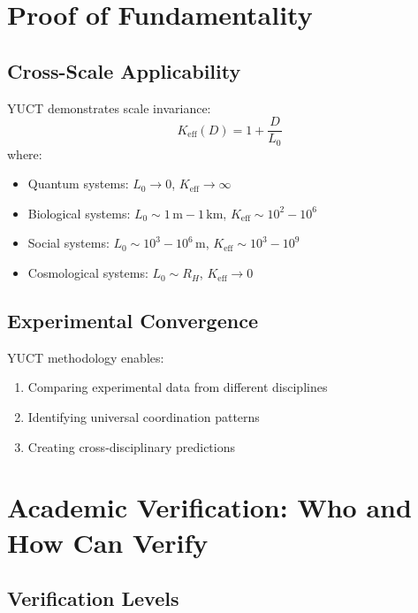 \documentclass[12pt,a4paper]{article}
\begin{document}
	\section{Proof of Fundamentality}
	
	\subsection{Cross-Scale Applicability}
	
	YUCT demonstrates scale invariance:
	\[
	K_{\mathrm{eff}}(D) = 1 + \frac{D}{L_0}
	\]
	where:
	\begin{itemize}
		\item Quantum systems: $L_0 \to 0$, $K_{\mathrm{eff}} \to \infty$
		\item Biological systems: $L_0 \sim 1\,\mathrm{m}-1\,\mathrm{km}$, $K_{\mathrm{eff}} \sim 10^2-10^6$
		\item Social systems: $L_0 \sim 10^3-10^6\,\mathrm{m}$, $K_{\mathrm{eff}} \sim 10^3-10^9$
		\item Cosmological systems: $L_0 \sim R_H$, $K_{\mathrm{eff}} \to 0$
	\end{itemize}
	
	\subsection{Experimental Convergence}
	
	YUCT methodology enables:
	\begin{enumerate}
		\item Comparing experimental data from different disciplines
		\item Identifying universal coordination patterns
		\item Creating cross-disciplinary predictions
	\end{enumerate}
	
	\section{Academic Verification: Who and How Can Verify}
	
	\subsection{Verification Levels}
	
\end{document}
